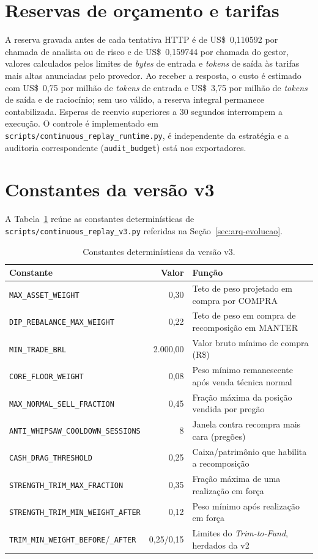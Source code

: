 \section{Reservas de orçamento e tarifas}

A reserva gravada antes de cada tentativa HTTP é de US\$~0,110592 por chamada de analista ou de risco e de US\$~0,159744 por chamada do gestor, valores calculados pelos limites de \textit{bytes} de entrada e \textit{tokens} de saída às tarifas mais altas anunciadas pelo provedor. Ao receber a resposta, o custo é estimado com US\$~0,75 por milhão de \textit{tokens} de entrada e US\$~3,75 por milhão de \textit{tokens} de saída e de raciocínio; sem uso válido, a reserva integral permanece contabilizada. Esperas de reenvio superiores a 30 segundos interrompem a execução. O controle é implementado em \texttt{scripts/continuous\_replay\_runtime.py}, é independente da estratégia e a auditoria correspondente (\texttt{audit\_budget}) está nos exportadores.

\section{Constantes da versão v3}

A Tabela~\ref{tab:constantes-v3} reúne as constantes determinísticas de \texttt{scripts/continuous\_replay\_v3.py} referidas na Seção~\ref{sec:arq-evolucao}.

\begin{table}[htbp]
\centering
\caption{Constantes determinísticas da versão v3.}
\label{tab:constantes-v3}
\small
\begin{tabular}{l r p{6.4cm}}
\toprule
\textbf{Constante} & \textbf{Valor} & \textbf{Função} \\
\midrule
\texttt{MAX\_ASSET\_WEIGHT} & 0,30 & Teto de peso projetado em compra por COMPRA \\
\texttt{DIP\_REBALANCE\_MAX\_WEIGHT} & 0,22 & Teto de peso em compra de recomposição em MANTER \\
\texttt{MIN\_TRADE\_BRL} & 2.000,00 & Valor bruto mínimo de compra (R\$) \\
\texttt{CORE\_FLOOR\_WEIGHT} & 0,08 & Peso mínimo remanescente após venda técnica normal \\
\texttt{MAX\_NORMAL\_SELL\_FRACTION} & 0,45 & Fração máxima da posição vendida por pregão \\
\texttt{ANTI\_WHIPSAW\_COOLDOWN\_SESSIONS} & 8 & Janela contra recompra mais cara (pregões) \\
\texttt{CASH\_DRAG\_THRESHOLD} & 0,25 & Caixa/patrimônio que habilita a recomposição \\
\texttt{STRENGTH\_TRIM\_MAX\_FRACTION} & 0,35 & Fração máxima de uma realização em força \\
\texttt{STRENGTH\_TRIM\_MIN\_WEIGHT\_AFTER} & 0,12 & Peso mínimo após realização em força \\
\texttt{TRIM\_MIN\_WEIGHT\_BEFORE}/\texttt{\_AFTER} & 0,25/0,15 & Limites do \textit{Trim-to-Fund}, herdados da v2 \\
\bottomrule
\end{tabular}
\end{table}

